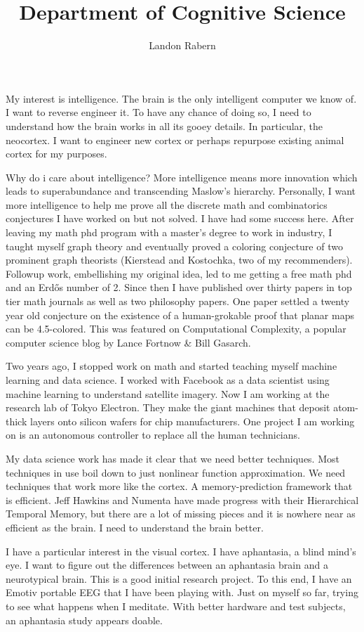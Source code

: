 \documentclass{article}
\title{Department of Cognitive Science}
\author{Landon Rabern}
\begin{document}
\maketitle
My interest is intelligence. The brain is the only intelligent computer we know of. I want to reverse engineer it. To have any chance of doing so, I need to understand how the brain works in all its gooey details. In particular, the neocortex. I want to engineer new cortex or perhaps repurpose existing animal cortex for my purposes. 

Why do i care about intelligence? More intelligence means more innovation which leads to superabundance and transcending Maslow's hierarchy. Personally, I want more intelligence to help me prove all the discrete math and combinatorics conjectures I have worked on but not solved. I have had some success here. After leaving my math phd program with a master's degree to work in industry, I taught myself graph theory and eventually proved a coloring conjecture of two prominent graph theorists (Kierstead and Kostochka, two of my recommenders). Followup work, embellishing my original idea, led to me getting a free math phd and an Erdős number of 2.  Since then I have published over thirty papers in top tier math journals as well as two philosophy papers. One paper settled a twenty year old conjecture on the existence of a human-grokable proof that planar maps can be 4.5-colored. This was featured on Computational Complexity, a popular computer science blog by Lance Fortnow \& Bill Gasarch.

Two years ago, I stopped work on math and started teaching myself machine learning and data science. I worked with Facebook as a data scientist using machine learning to understand satellite imagery. Now I am working at the research lab of Tokyo Electron. They make the giant machines that deposit atom-thick layers onto silicon wafers for chip manufacturers. One project I am working on is an autonomous controller to replace all the human technicians. 

My data science work has made it clear that we need better techniques. Most techniques in use boil down to just nonlinear function approximation. We need techniques that work more like the cortex. A memory-prediction framework that is efficient. Jeff Hawkins and Numenta have made progress with their Hierarchical Temporal Memory, but there are a lot of missing pieces and it is nowhere near as efficient as the brain. I need to understand the brain better. 

I have a particular interest in the visual cortex. I have aphantasia, a blind mind's eye. I want to figure out the differences between an aphantasia brain and a neurotypical brain. This is a good initial research project. To this end, I have an Emotiv portable EEG that I have been playing with. Just on myself so far, trying to see what happens when I meditate. With better hardware and test subjects, an aphantasia study appears doable.
\end{document}
